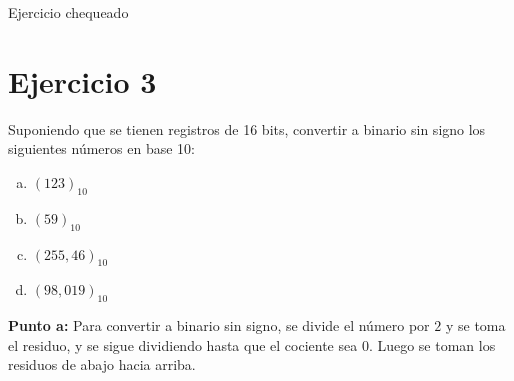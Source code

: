\documentclass{article}
\begin{document}
{\color{green} Ejercicio chequeado}

\section*{Ejercicio 3}
Suponiendo que se tienen registros de 16 bits, convertir a binario sin signo los siguientes números en base 10:
\begin{enumerate}[a)]
    \item $(123)_{10}$
    \item $(59)_{10}$
    \item $(255,46)_{10}$
    \item $(98,019)_{10}$
\end{enumerate}

\textbf{Punto a:} Para convertir a binario sin signo, se divide el número por $2$ y se toma el residuo, y se sigue dividiendo hasta que el cociente sea $0$. Luego se toman los residuos de abajo hacia arriba.
\end{document}
